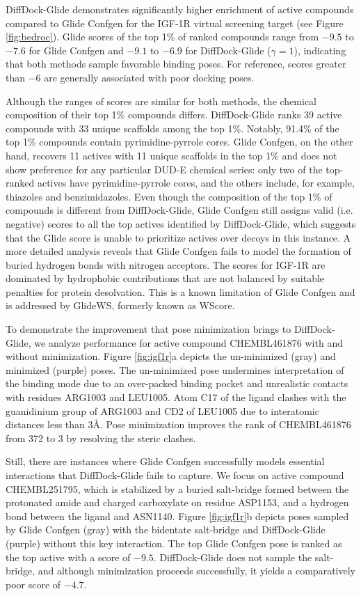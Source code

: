 \documentclass[%
 aip,
 amsmath,amssymb,
reprint,%
]{revtex4-1}
\begin{document}
DiffDock-Glide demonstrates significantly higher enrichment of active compounds compared to Glide Confgen for the IGF-1R virtual screening target (see Figure \ref{fig:bedroc}). Glide scores of the top 1\% of ranked compounds range from $-9.5$ to $-7.6$ for Glide Confgen and $-9.1$ to $-6.9$ for DiffDock-Glide ($\gamma=1$), indicating that both methods sample favorable binding poses. For reference, scores greater than $-6$ are generally associated with poor docking poses. \cite{friesner2004glide}

Although the ranges of scores are similar for both methods, the chemical composition of their top 1\% compounds differs.
DiffDock-Glide ranks 39 active compounds with 33 unique scaffolds among the top 1\%. Notably, 91.4\% of the top 1\% compounds contain pyrimidine-pyrrole cores. Glide Confgen, on the other hand, recovers 11 actives with 11 unique scaffolds in the top 1\% and does not show preference for any particular DUD-E chemical series: only two of the top-ranked actives have pyrimidine-pyrrole cores, and the others include, for example, thiazoles and benzimidazoles. Even though the composition of the top 1\% of compounds is different from DiffDock-Glide, Glide Confgen still assigns valid (i.e. negative) scores to all the top actives identified by DiffDock-Glide, which suggests that the Glide score is unable to prioritize actives over decoys in this instance. A more detailed analysis reveals that Glide Confgen fails to model the formation of buried hydrogen bonds with nitrogen acceptors. The scores for IGF-1R are dominated by hydrophobic contributions that are not balanced by suitable penalties for protein desolvation. This is a known limitation of Glide Confgen and is addressed by GlideWS, formerly known as WScore.\cite{murphy2016wscore}

To demonstrate the improvement that pose minimization brings to DiffDock-Glide, we analyze performance for active compound CHEMBL461876 with and without minimization. Figure \ref{fig:igf1r}a depicts the un-minimized (gray) and minimized (purple) poses. The un-minimized pose undermines interpretation of the binding mode due to an over-packed binding pocket and unrealistic contacts with residues ARG1003 and LEU1005. Atom C17 of the ligand clashes with the guanidinium group of ARG1003 and CD2 of LEU1005 due to interatomic distances less than 3{\AA}. Pose minimization improves the rank of CHEMBL461876 from 372 to 3 by resolving the steric clashes.

Still, there are instances where Glide Confgen successfully models essential interactions that DiffDock-Glide fails to capture. We focus on active compound CHEMBL251795, which is stabilized by a buried salt-bridge formed between the protonated amide and charged carboxylate on residue ASP1153, and a hydrogen bond between the ligand and ASN1140. Figure \ref{fig:igf1r}b depicts poses sampled by Glide Confgen (gray) with the bidentate salt-bridge and DiffDock-Glide (purple) without this key interaction. The top Glide Confgen pose is ranked as the top active with a score of $-9.5$. DiffDock-Glide does not sample the salt-bridge, and although minimization proceeds successfully, it yields a comparatively poor score of $-4.7$.
\end{document}

